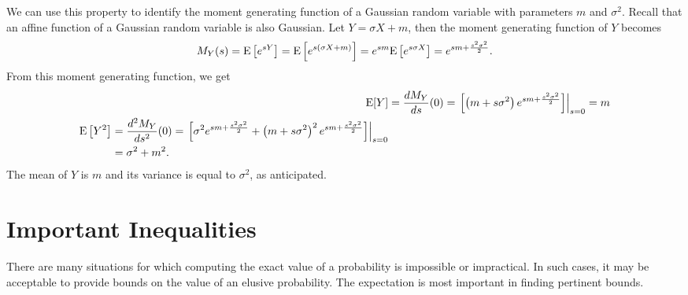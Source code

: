\begin{example}
We can use this property to identify the moment generating function of a Gaussian random variable with parameters $m$ and $\sigma^2$.
Recall that an affine function of a Gaussian random variable is also Gaussian.
Let $Y = \sigma X + m$, then the moment generating function of $Y$ becomes
\begin{equation*}
M_Y (s) = \mathrm{E} \left[ e^{sY} \right]
= \mathrm{E} \left[ e^{s(\sigma X + m)} \right]
= e^{sm} \mathrm{E} \left[ e^{s\sigma X} \right]
= e^{sm + \frac{s^2 \sigma^2}{2} } .
\end{equation*}
From this moment generating function, we get
\begin{align*}
\mathrm{E} [Y] &= \frac{d M_Y}{ds} (0)
= \left. \left[ \left(m + s \sigma^2 \right)
e^{sm + \frac{s^2 \sigma^2}{2} } \right] \right|_{s=0} = m \\
\begin{split}
\mathrm{E} \left[ Y^2 \right] &= \frac{d^2 M_Y}{ds^2} (0)
= \left.  \left[ \sigma^2 e^{sm + \frac{s^2 \sigma^2}{2} }
+ \left(m + s \sigma^2 \right)^2  e^{sm + \frac{s^2 \sigma^2}{2} } \right]
\right|_{s=0} \\
&= \sigma^2 + m^2 .
\end{split}
\end{align*}
The mean of $Y$ is $m$ and its variance is equal to $\sigma^2$, as anticipated.
\end{example}


\section{Important Inequalities}

There are many situations for which computing the exact value of a probability is impossible or impractical.
In such cases, it may be acceptable to provide bounds on the value of an elusive probability.
The expectation is most important in finding pertinent bounds.

